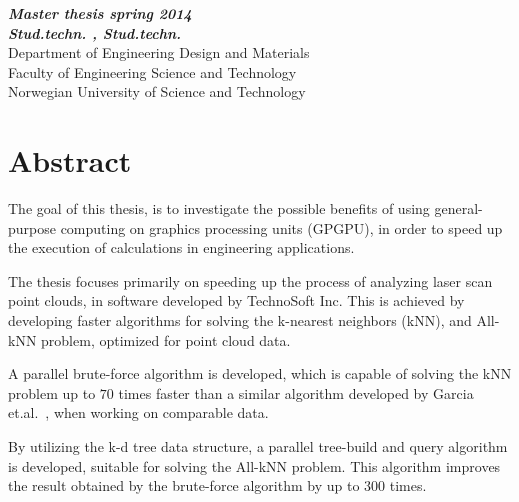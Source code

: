 \begin{center}
{\Large\bfseries \mytitle}
\end{center}

\begin{center}
{\bfseries\slshape Master thesis spring 2014}
\\[1.0cm]
{\bfseries\slshape
Stud.techn. \myauthorA, Stud.techn. \myauthorB \\}
Department of Engineering Design and Materials \\
Faculty of Engineering Science and Technology\\
Norwegian University of Science and Technology
\end{center}
\section*{Abstract}

The goal of this thesis, is to investigate the possible benefits of using general-purpose computing on graphics processing units (GPGPU), in order to speed up the execution of calculations in engineering applications.

The thesis focuses primarily on speeding up the process of analyzing laser scan point clouds, in software developed by TechnoSoft Inc. This is achieved by developing faster algorithms for solving the k-nearest neighbors (kNN), and All-kNN problem, optimized for point cloud data.

A parallel brute-force algorithm is developed, which is capable of solving the kNN problem up to $70$ times faster than a similar algorithm developed by Garcia et.al\@.~\cite{Garcia2008}, when working on comparable data.

By utilizing the k-d tree data structure, a parallel tree-build and query algorithm is developed, suitable for solving the All-kNN problem. This algorithm improves the result obtained by the brute-force algorithm by up to $300$ times.







\clearpage\
